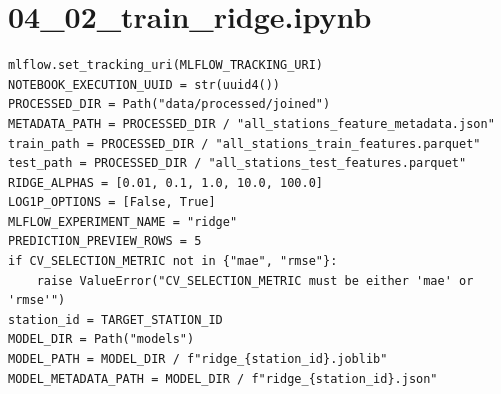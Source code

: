 \section{04\_02\_train\_ridge.ipynb}

\begin{verbatim}
mlflow.set_tracking_uri(MLFLOW_TRACKING_URI)
NOTEBOOK_EXECUTION_UUID = str(uuid4())
PROCESSED_DIR = Path("data/processed/joined")
METADATA_PATH = PROCESSED_DIR / "all_stations_feature_metadata.json"
train_path = PROCESSED_DIR / "all_stations_train_features.parquet"
test_path = PROCESSED_DIR / "all_stations_test_features.parquet"
RIDGE_ALPHAS = [0.01, 0.1, 1.0, 10.0, 100.0]
LOG1P_OPTIONS = [False, True]
MLFLOW_EXPERIMENT_NAME = "ridge"
PREDICTION_PREVIEW_ROWS = 5
if CV_SELECTION_METRIC not in {"mae", "rmse"}:
    raise ValueError("CV_SELECTION_METRIC must be either 'mae' or 'rmse'")
station_id = TARGET_STATION_ID
MODEL_DIR = Path("models")
MODEL_PATH = MODEL_DIR / f"ridge_{station_id}.joblib"
MODEL_METADATA_PATH = MODEL_DIR / f"ridge_{station_id}.json"
\end{verbatim}

